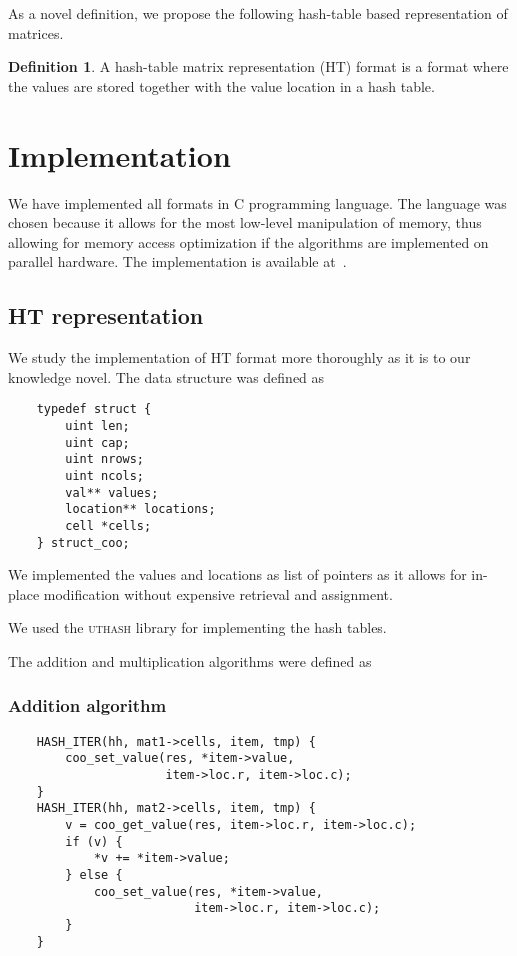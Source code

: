 \documentclass[portrait,a0]{sciposter}
\theoremstyle{definition}\newtheorem{definition}{Definition}
\theoremstyle{plain}\newtheorem{example}{Example}
\theoremstyle{plain} \newtheorem{theorem}{Theorem}
\begin{document}
\begin{multicols}{2}
    As a novel definition, we propose the following hash-table based
    representation of matrices.

    \begin{definition}
        A hash-table matrix representation (HT) format is a format where the
        values are stored together with the value location in a hash table.
    \end{definition}

    \section{Implementation}

    We have implemented all formats in C programming language. The language was
    chosen because it allows for the most low-level manipulation of memory, thus
    allowing for memory access optimization if the algorithms are implemented on
    parallel hardware. The implementation is available at~\cite{algoproject}.

    \subsection{HT representation}

    We study the implementation of HT format more thoroughly as it is to our
    knowledge novel. The data structure was defined as
    \begin{verbatim}
    typedef struct {
        uint len;
        uint cap;
        uint nrows;
        uint ncols;
        val** values;
        location** locations;
        cell *cells;
    } struct_coo;
    \end{verbatim}

    We implemented the values and locations as list of pointers as it allows for
    in-place modification without expensive retrieval and assignment.

    We used the \textsc{uthash} library for implementing the hash tables.

    The addition and multiplication algorithms were defined as
    
    \subsubsection{Addition algorithm}

    \begin{verbatim}
    HASH_ITER(hh, mat1->cells, item, tmp) {
        coo_set_value(res, *item->value,
                      item->loc.r, item->loc.c);
    }
    HASH_ITER(hh, mat2->cells, item, tmp) {
        v = coo_get_value(res, item->loc.r, item->loc.c);
        if (v) {
            *v += *item->value;
        } else {
            coo_set_value(res, *item->value,
                          item->loc.r, item->loc.c);
        }
    }
    \end{verbatim}


\end{multicols}
\end{document}
